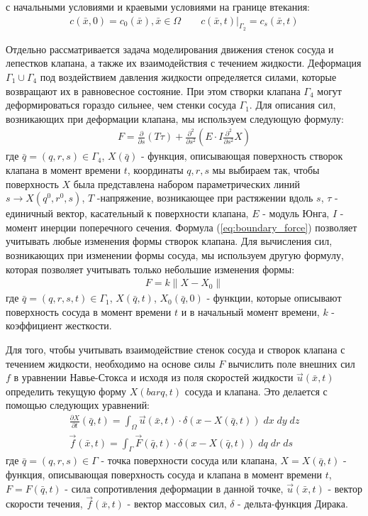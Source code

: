 с начальными условиями и краевыми условиями на границе втекания:
\begin{gather}
    \label{eq:convection:conditions}
    c(\bar{x}, 0) = c_0(\bar{x}), \bar{x} \in \Omega \qquad c(\bar{x}, t)|_{\Gamma_2} = c_s(\bar{x}, t)
\end{gather}

Отдельно рассматривается задача моделирования движения стенок сосуда и лепестков клапана,
а также их взаимодействия с течением жидкости. Деформация $\Gamma_1 \cup \Gamma_4$ под воздействием давления жидкости
определяется силами, которые возвращают их в равновесное состояние. При этом створки клапана $\Gamma_4$ могут 
деформироваться гораздо сильнее, чем стенки сосуда $\Gamma_1$. Для описания сил, возникающих при деформации клапана,
мы используем следующую формулу:
\begin{gather}
    \label{eq:boundary_force}
    F = \frac{\partial}{\partial s} (T \tau) + \frac{\partial^2}{\partial s^2} (E \cdot I \frac{\partial^2}{\partial s^2} X)
\end{gather}
где $\bar{q}=(q, r, s) \in \Gamma_4$, $X(\bar{q})$ - функция, описывающая поверхность створок клапана в момент времени $t$,
координаты $q, r, s$ мы выбираем так, чтобы поверхность $X$ была представлена набором параметрических линий $s \rightarrow X(q^0, r^0, s)$,
$T$ -напряжение, возникающее при растяжении вдоль $s$, $\tau$ - единичный вектор, касательный к поверхности клапана, $E$ - модуль Юнга,
$I$ - момент инерции поперечного сечения. Формула (\ref{eq:boundary_force}) позволяет учитывать любые изменения формы створок клапана.  
Для вычисления сил, возникающих при изменении формы сосуда, мы используем другую формулу, которая позволяет учитывать только 
небольшие изменения формы:
\begin{gather}
    \label{eq:boundary_force_simpe}
    F = k \|X - X_0\|
\end{gather}
где $\bar{q} = (q, r, s, t) \in \Gamma_1$, $X(\bar{q}, t)$, $X_0(\bar{q}, 0)$ - функции, которые описывают поверхность сосуда в момент времени $t$
и в начальный момент времени, $k$ - коэффициент жесткости.

Для того, чтобы учитывать взаимодействие стенок сосуда и створок клапана с течением жидкости, необходимо на основе силы $F$
вычислить поле внешних сил $f$ в уравнении Навье-Стокса и исходя из поля скоростей жидкости $\vec{u}(\bar{x}, t)$
определить текущую форму $X(bar{q}, t)$ сосуда и клапана. Это делается с помощью следующих уравнений:
\begin{gather}
    \label{eq:interaction:velocity}
    \frac{\partial X}{\partial t}(\bar{q}, t) = \int_{\Omega} \vec{u}(\bar{x}, t) \cdot \delta (x - X(\bar{q}, t))\; dx\; dy\; dz\\
    \label{eq:interaction:force}
    \vec{f}(\bar{x}, t) = \int_{\Gamma} \vec{F}(\bar{q}, t) \cdot \delta (x - X(\bar{q}, t))\; dq\; dr\; ds
\end{gather}
где $\bar{q} = (q, r, s) \in \Gamma$ - точка поверхности сосуда или клапана, $X = X(\bar{q}, t)$ - функция, описывающая поверхность сосуда и клапана
в момент времени $t$, $F = F(\bar{q}, t)$ - сила сопротивления деформации в данной точке,
$\vec{u}(\bar{x}, t)$ - вектор скорости течения, $\vec{f}(\bar{x}, t)$ - вектор массовых сил, $\delta$ - дельта-функция Дирака.

